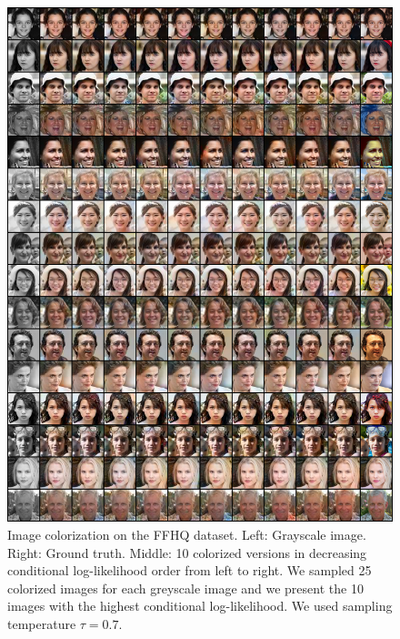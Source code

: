 \begin{figure}[h!]
    \centering
    \includegraphics[width=\textwidth]{Chapter1/paper_graphs/SupplementaryMaterial/colorization_ffhq_0.7_1.png}
    \caption{Image colorization on the FFHQ dataset. Left: Grayscale image. Right: Ground truth. Middle: 10 colorized versions in decreasing conditional log-likelihood order from left to right. We sampled 25 colorized images for each greyscale image and we present the 10 images with the highest conditional log-likelihood. We used sampling temperature $\tau=0.7$.}
\end{figure}

\clearpage
